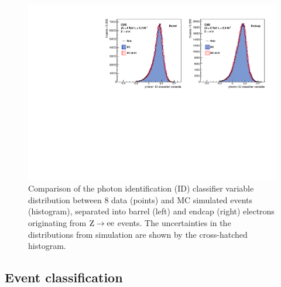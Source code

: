 \documentclass[12pt,twoside,a4paper,cmspaper,final,collab]{cms-tdr}
\begin{document}
\begin{figure}[htbp]
  \begin{center}
    \includegraphics[width=0.98\linewidth]{figures/hgg_idmva_noratio.pdf}
    \caption{
      Comparison of the photon identification (ID) classifier variable distribution between 8\TeV
      data (points) and MC simulated events (histogram),
      separated into barrel (left) and endcap (right) electrons originating from $\mathrm{Z}\to \mathrm{e}\mathrm{e}$ events.
      The uncertainties in the distributions from simulation are shown by the cross-hatched histogram.
    }
    \label{fig:hgg_idmva}
  \end{center}
\end{figure}



\subsection{Event classification}
\label{sec:hgg_diphotonBDT}
\end{document}
